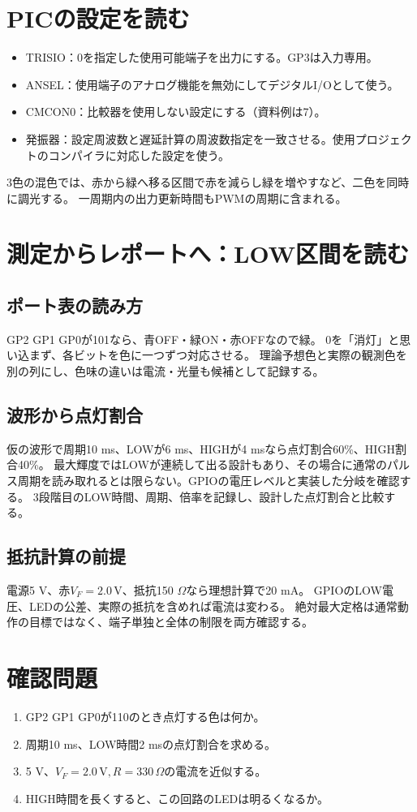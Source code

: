 \documentclass[lualatex,a4paper,10pt]{jlreq}
\begin{document}
\section{PICの設定を読む}\label{sec:auto6}
\begin{itemize}
\item TRISIO：0を指定した使用可能端子を出力にする。GP3は入力専用。
\item ANSEL：使用端子のアナログ機能を無効にしてデジタルI/Oとして使う。
\item CMCON0：比較器を使用しない設定にする（資料例は7）。
\item 発振器：設定周波数と遅延計算の周波数指定を一致させる。使用プロジェクトのコンパイラに対応した設定を使う。
\end{itemize}
3色の混色では、赤から緑へ移る区間で赤を減らし緑を増やすなど、二色を同時に調光する。
一周期内の出力更新時間もPWMの周期に含まれる。
\section{測定からレポートへ：LOW区間を読む}\label{sec:auto7}
\subsection{ポート表の読み方}
GP2 GP1 GP0が101なら、青OFF・緑ON・赤OFFなので緑。
0を「消灯」と思い込まず、各ビットを色に一つずつ対応させる。
理論予想色と実際の観測色を別の列にし、色味の違いは電流・光量も候補として記録する。
\subsection{波形から点灯割合}
仮の波形で周期10 ms、LOWが6 ms、HIGHが4 msなら点灯割合60\%、HIGH割合40\%。
最大輝度ではLOWが連続して出る設計もあり、その場合に通常のパルス周期を読み取れるとは限らない。GPIOの電圧レベルと実装した分岐を確認する。
3段階目のLOW時間、周期、倍率を記録し、設計した点灯割合と比較する。
\subsection{抵抗計算の前提}
電源5 V、赤$V_F=2.0\,\mathrm{V}$、抵抗150 $\Omega$なら理想計算で20 mA。
GPIOのLOW電圧、LEDの公差、実際の抵抗を含めれば電流は変わる。
絶対最大定格は通常動作の目標ではなく、端子単独と全体の制限を両方確認する。

\clearpage
\section{確認問題}\label{sec:auto8}
\begin{enumerate}
\item GP2 GP1 GP0が110のとき点灯する色は何か。\answerline
\item 周期10 ms、LOW時間2 msの点灯割合を求める。\answerline
\item 5 V、$V_F=2.0\,\mathrm{V},R=330\,\Omega$の電流を近似する。\answerline
\item HIGH時間を長くすると、この回路のLEDは明るくなるか。\answerline
\end{enumerate}
\end{document}
